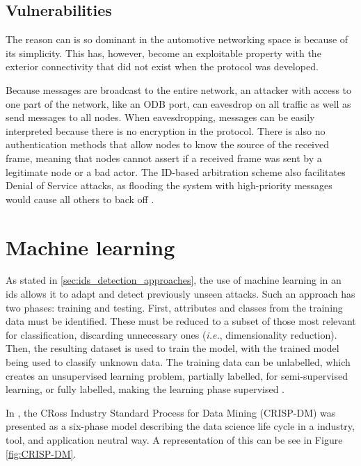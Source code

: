 \subsection{Vulnerabilities}

The reason \gls{can} is so dominant in the automotive networking space is because of its simplicity. This has, however, become an exploitable property with the exterior connectivity that did not exist when the protocol was developed.\par

Because messages are broadcast to the entire network, an attacker with access to one part of the network, like an ODB port, can eavesdrop on all traffic as well as send messages to all nodes. When eavesdropping, messages can be easily interpreted because there is no encryption in the protocol. There is also no authentication methods that allow nodes to know the source of the received frame, meaning that nodes cannot assert if a received frame was sent by a legitimate node or a bad actor. The ID-based arbitration scheme also facilitates Denial of Service attacks, as flooding the system with high-priority messages would cause all others to back off \citep{scalas2019automotive}.

\section{Machine learning}

As stated in \ref{sec:ids_detection_approaches}, the use of machine learning in an \gls{ids} allows it to adapt and detect previously unseen attacks. Such an approach has two phases: training and testing. First, attributes and classes from the training data must be identified. These must be reduced to a subset of those most relevant for classification, discarding unnecessary ones (\textit{i.e.}, dimensionality reduction). Then, the resulting dataset is used to train the model, with the trained model being used to classify unknown data. The training data can be unlabelled, which creates an unsupervised learning problem, partially labelled, for semi-supervised learning, or fully labelled, making the learning phase supervised \citep{Buczak2016}.\par

In \citep{Shearer2000}, the CRoss Industry Standard Process for Data Mining (CRISP-DM) was presented as a six-phase model describing the data science life cycle in a industry, tool, and application neutral way. A representation of this can be see in Figure \ref{fig:CRISP-DM}.

